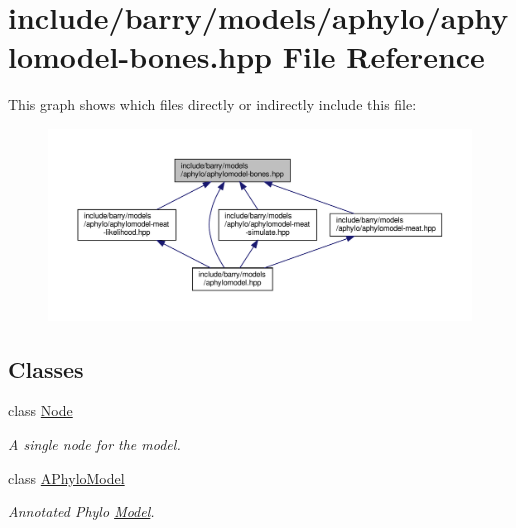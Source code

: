 \hypertarget{aphylomodel-bones_8hpp}{}\section{include/barry/models/aphylo/aphylomodel-\/bones.hpp File Reference}
\label{aphylomodel-bones_8hpp}
This graph shows which files directly or indirectly include this file\+:
\nopagebreak
\begin{figure}[H]
\begin{center}
\leavevmode
\includegraphics[width=350pt]{aphylomodel-bones_8hpp__dep__incl}
\end{center}
\end{figure}
\subsection*{Classes}
\begin{DoxyCompactItemize}
\item 
class \hyperlink{class_node}{Node}
\begin{DoxyCompactList}\small\item\em A single node for the model. \end{DoxyCompactList}\item 
class \hyperlink{class_a_phylo_model}{A\+Phylo\+Model}
\begin{DoxyCompactList}\small\item\em Annotated Phylo \hyperlink{class_model}{Model}. \end{DoxyCompactList}\end{DoxyCompactItemize}
